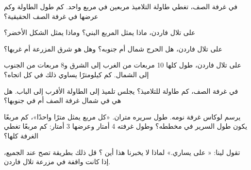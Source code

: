 \begin{exercise}[$\star$]\label{exo:g2:drawing-to-map:5}
في  غرفة الصف، تغطي طاولة التلاميذ مربعين في مربع واحد. كم طول
الطاولة وكم عرضها في غرفة الصف الحقيقية؟
\end{exercise}

\begin{exercise}[$\star$]\label{exo:g2:drawing-to-map:6}
على  تلال فاردن، ماذا يمثل المربع البني؟ وماذا يمثل
الشكل الأخضر؟
\end{exercise}

\begin{exercise}[$\star\star$]\label{exo:g2:drawing-to-map:7}
على  تلال فاردن، هل الحرج شمال  أم جنوبه؟
وهل هو شرق المزرعة أم غربها؟
\end{exercise}

\begin{exercise}[$\star\star$]\label{exo:g2:drawing-to-map:8}
على  تلال فاردن، طول  كلها 10 مربعات من الغرب إلى الشرق
و8 مربعات من الجنوب إلى الشمال. كم كيلومترًا يساوي ذلك في كل
اتجاه؟
\end{exercise}

\begin{exercise}[$\star\star$]\label{exo:g2:drawing-to-map:9}
في  غرفة الصف، كم طاولة للتلاميذ؟ يجلس تلميذ إلى الطاولة الأقرب إلى
الباب. هل هي في شمال غرفة الصف أم في
جنوبها؟
\end{exercise}

\begin{exercise}[$\star\star$]\label{exo:g2:drawing-to-map:10}
يرسم لوكاس  غرفة نومه. طول سريره متران. 
«كل مربع يمثل مترًا واحدًا»، كم مربعًا يكون طول السرير في مخططه؟ وطول
غرفته 4 أمتار وعرضها 3 أمتار: كم مربعًا تغطي الغرفة
كلها؟
\end{exercise}

\begin{exercise}[$\star\star$]\label{exo:g2:drawing-to-map:11}
تقول لينا: « على يساري.» لماذا لا يخبرنا هذا أين ؟ قل ذلك
بطريقة تصح عند الجميع، إذا كانت واقفة في مزرعة تلال
فاردن.
\end{exercise}
